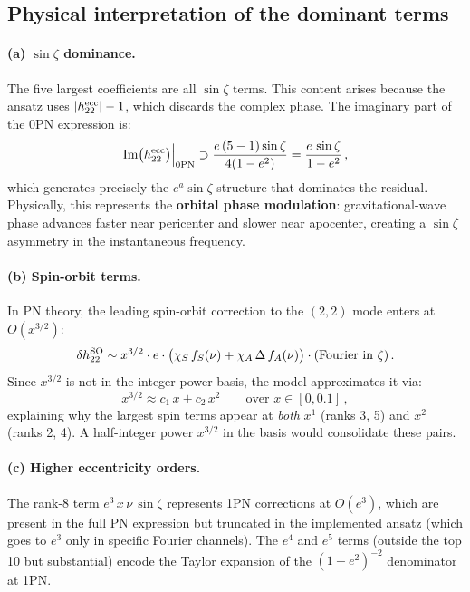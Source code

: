 \documentclass[11pt,letterpaper]{article}
\newcommand{\chiS}{\chi_S}
\newcommand{\chiA}{\chi_A}
\begin{document}
\subsection{Physical interpretation of the dominant terms}

\paragraph{(a) $\sin\zeta$ dominance.}
The five largest coefficients are all $\sin\zeta$ terms. This content arises because the ansatz uses $|h_{22}^{\rm ecc}| - 1$, which discards the complex phase. The imaginary part of the 0PN expression is:
\begin{equation}
\text{Im}\bigl(h_{22}^{\rm ecc}\bigr)\Big|_{\rm 0PN} \supset \frac{e\,(5 - 1)\sin\zeta}{4(1 - e^2)} = \frac{e\,\sin\zeta}{1 - e^2}\,,
\label{eq:imag0pn}
\end{equation}
which generates precisely the $e^a \sin\zeta$ structure that dominates the residual. Physically, this represents the \textbf{orbital phase modulation}: gravitational-wave phase advances faster near pericenter and slower near apocenter, creating a $\sin\zeta$ asymmetry in the instantaneous frequency.

\paragraph{(b) Spin-orbit terms.}
In PN theory, the leading spin-orbit correction to the $(2,2)$ mode enters at $O(x^{3/2})$:
\begin{equation}
\delta h_{22}^{\rm SO} \sim x^{3/2} \cdot e \cdot \bigl(\chiS\, f_S(\nu) + \chiA\,\Delta\, f_A(\nu)\bigr) \cdot (\text{Fourier in } \zeta)\,.
\label{eq:so}
\end{equation}
Since $x^{3/2}$ is not in the integer-power basis, the model approximates it via:
\begin{equation}
x^{3/2} \approx c_1\, x + c_2\, x^2 \qquad \text{over } x \in [0, 0.1]\,,
\label{eq:x32approx}
\end{equation}
explaining why the largest spin terms appear at \emph{both} $x^1$ (ranks 3, 5) and $x^2$ (ranks 2, 4). A half-integer power $x^{3/2}$ in the basis would consolidate these pairs.

\paragraph{(c) Higher eccentricity orders.}
The rank-8 term $e^3\, x\, \nu\, \sin\zeta$ represents 1PN corrections at $O(e^3)$, which are present in the full PN expression but truncated in the implemented ansatz (which goes to $e^3$ only in specific Fourier channels). The $e^4$ and $e^5$ terms (outside the top 10 but substantial) encode the Taylor expansion of the $(1 - e^2)^{-2}$ denominator at 1PN.
\end{document}
